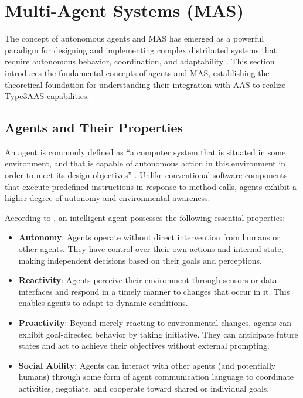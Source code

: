 \section{Multi-Agent Systems (MAS)}
\label{sec:mas}

The concept of autonomous agents and \ac{MAS} has emerged as a powerful paradigm for designing and implementing complex distributed systems that require autonomous behavior, coordination, and adaptability \cite{wooldridge2009introduction}. This section introduces the fundamental concepts of agents and \ac{MAS}, establishing the theoretical foundation for understanding their integration with \ac{AAS} to realize \ac{Type3AAS} capabilities.

\subsection{Agents and Their Properties}
\label{subsec:agents_properties}

An agent is commonly defined as ``a computer system that is situated in some environment, and that is capable of autonomous action in this environment in order to meet its design objectives'' \cite{wooldridge2009introduction}. Unlike conventional software components that execute predefined instructions in response to method calls, agents exhibit a higher degree of autonomy and environmental awareness.

According to \cite{wooldridge1995intelligent}, an intelligent agent possesses the following essential properties:

\begin{itemize}
    \item \textbf{Autonomy}: Agents operate without direct intervention from humans or other agents. They have control over their own actions and internal state, making independent decisions based on their goals and perceptions.
    
    \item \textbf{Reactivity}: Agents perceive their environment through sensors or data interfaces and respond in a timely manner to changes that occur in it. This enables agents to adapt to dynamic conditions.
    
    \item \textbf{Proactivity}: Beyond merely reacting to environmental changes, agents can exhibit goal-directed behavior by taking initiative. They can anticipate future states and act to achieve their objectives without external prompting.
    
    \item \textbf{Social Ability}: Agents can interact with other agents (and potentially humans) through some form of agent communication language to coordinate activities, negotiate, and cooperate toward shared or individual goals.
\end{itemize}

